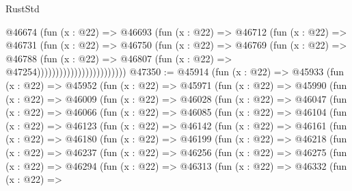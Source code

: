 \begin{lexlean}{RustStd}
\begin{coremodule}
                                  @46674
                                    (fun (x : @22) =>
                                    @46693
                                      (fun (x : @22) =>
                                      @46712
                                        (fun (x : @22) =>
                                        @46731
                                          (fun (x : @22) =>
                                          @46750
                                            (fun (x : @22) =>
                                            @46769
                                              (fun (x : @22) =>
                                              @46788
                                                (fun (x : @22) =>
                                                @46807
                                                  (fun (x : @22) => @47254))))))))))))))))))))))))
@47350 := @45914
    (fun (x : @22) =>
    @45933
      (fun (x : @22) =>
      @45952
        (fun (x : @22) =>
        @45971
          (fun (x : @22) =>
          @45990
            (fun (x : @22) =>
            @46009
              (fun (x : @22) =>
              @46028
                (fun (x : @22) =>
                @46047
                  (fun (x : @22) =>
                  @46066
                    (fun (x : @22) =>
                    @46085
                      (fun (x : @22) =>
                      @46104
                        (fun (x : @22) =>
                        @46123
                          (fun (x : @22) =>
                          @46142
                            (fun (x : @22) =>
                            @46161
                              (fun (x : @22) =>
                              @46180
                                (fun (x : @22) =>
                                @46199
                                  (fun (x : @22) =>
                                  @46218
                                    (fun (x : @22) =>
                                    @46237
                                      (fun (x : @22) =>
                                      @46256
                                        (fun (x : @22) =>
                                        @46275
                                          (fun (x : @22) =>
                                          @46294
                                            (fun (x : @22) =>
                                            @46313
                                              (fun (x : @22) =>
                                              @46332
                                                (fun (x : @22) =>

\end{coremodule}
\end{lexlean}
